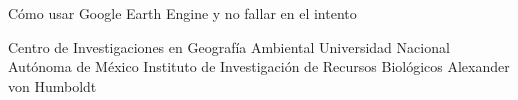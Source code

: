 \thispagestyle{empty}
\begin{center}

\end{center}

\newpage
{}
\vspace*{\fill}
\begin{center}
\LARGE{Cómo usar Google Earth Engine y no fallar en el intento}
\end{center}
\vspace*{\fill}

\newpage

\vspace*{\fill}
\begin{center}
\large{Centro de Investigaciones en Geografía Ambiental}
\linebreak
\large{Universidad Nacional Autónoma de México}
\linebreak
\large{Instituto de Investigación de Recursos Biológicos Alexander von Humboldt}
\end{center}
\vspace*{\fill}

\newpage

